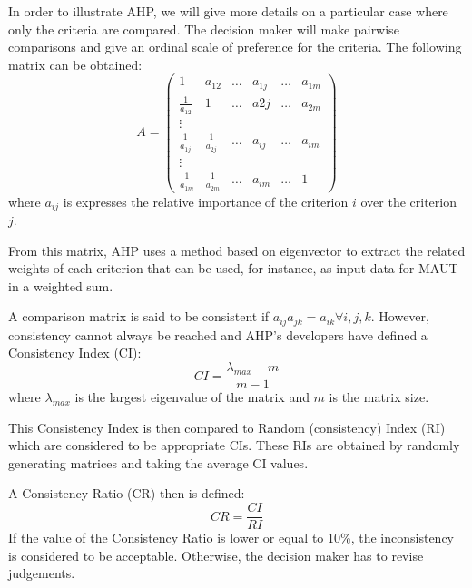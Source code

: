In order to illustrate AHP, we will give more details on a particular case where only the criteria are compared. The decision maker will make pairwise comparisons and give an ordinal scale of preference for the criteria. The following matrix can be obtained:
\begin{equation}
A=\begin{pmatrix}
1 & a_{12} & \dots & a_{1j} & \dots & a_{1m}\\
\frac{1}{a_{12}} & 1 & \dots & a{2j} & \dots & a_{2m}\\
\vdots \\
\frac{1}{a_{1j}} & \frac{1}{a_{2j}} & \dots & a_{ij} & \dots & a_{im}\\
\vdots \\
\frac{1}{a_{1m}} & \frac{1}{a_{2m}} & \dots & a_{im} & \dots & 1
\end{pmatrix}
\end{equation}
where $a_{ij}$ is expresses the relative importance of the criterion $i$ over the criterion $j$.

From this matrix, AHP uses a method based on eigenvector to extract the related weights of each criterion that can be used, for instance, as input data for MAUT in a weighted sum.

A comparison matrix is said to be consistent if $a_{ij} a_{jk} = a_{ik} \forall i, j, k$. However, consistency cannot always be reached and AHP's developers have defined a Consistency Index (CI):
\begin{equation}
CI = \frac{\lambda_{max}-m}{m-1}
\end{equation}
where $\lambda_{max}$ is the largest eigenvalue of the matrix and $m$ is the matrix size.

This Consistency Index is then compared to Random (consistency) Index (RI) which are considered to be appropriate CIs. These RIs are obtained by randomly generating matrices and taking the average CI values.

A Consistency Ratio (CR) then is defined:
\begin{equation}
CR = \frac{CI}{RI}
\end{equation}
If the value of the Consistency Ratio is lower or equal to 10\%, the inconsistency is considered to be acceptable. Otherwise, the decision maker has to revise judgements.

